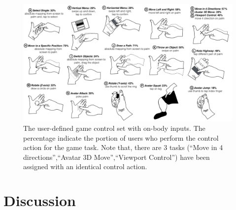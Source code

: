 \documentclass{sigchi}
\begin{document}
  \begin{figure}
  \centering
  \includegraphics[width=1\textwidth]{OnBodyInputSet.pdf}
  \caption{The user-defined game control set with on-body inputs. The percentage indicate the portion of users who perform the control action for the game task. Note that, there are 3 tasks (``Move in 4 directions'',``Avatar 3D Move'',``Viewport Control'') have been assigned with an identical control action.}
  \label{fig:OnBodyInputSet}
  \end{figure}


  \section{Discussion}
\end{document}
